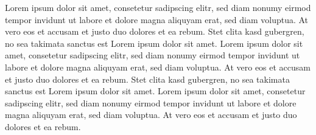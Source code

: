 \documentclass{vgtc}                          %
\begin{document}
Lorem ipsum dolor sit amet, consetetur sadipscing elitr, sed diam
nonumy eirmod tempor invidunt ut labore et dolore magna aliquyam erat,
sed diam voluptua. At vero eos et accusam et justo duo dolores et ea
rebum. Stet clita kasd gubergren, no sea takimata sanctus est Lorem
ipsum dolor sit amet. Lorem ipsum dolor sit amet, consetetur
sadipscing elitr, sed diam nonumy eirmod tempor invidunt ut labore et
dolore magna aliquyam erat, sed diam voluptua. At vero eos et accusam
et justo duo dolores et ea rebum. Stet clita kasd gubergren, no sea
takimata sanctus est Lorem ipsum dolor sit amet. Lorem ipsum dolor sit
amet, consetetur sadipscing elitr, sed diam nonumy eirmod tempor
invidunt ut labore et dolore magna aliquyam erat, sed diam
voluptua. At vero eos et accusam et justo duo dolores et ea
rebum.


%
%
%

%


\end{document}
